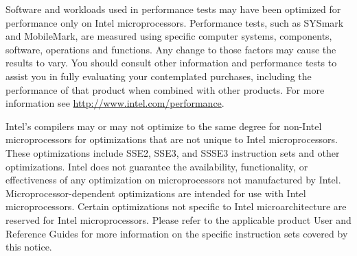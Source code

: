 
Software and workloads used in performance tests may have been
optimized for performance only on Intel microprocessors.  Performance
tests, such as SYSmark and MobileMark, are measured using specific
computer systems, components, software, operations and functions.  Any
change to those factors may cause the results to vary.  You
should consult other information and performance tests to assist you
in fully evaluating your contemplated purchases, including the
performance of that product when combined with other products.  For
more information see \url{http://www.intel.com/performance}.

Intel's compilers may or may not optimize to the same degree for
non-Intel microprocessors for optimizations that are not unique to
Intel microprocessors. These optimizations include SSE2, SSE3, and
SSSE3 instruction sets and other optimizations. Intel does not
guarantee the availability, functionality, or effectiveness of any
optimization on microprocessors not manufactured by
Intel. Microprocessor-dependent optimizations 
are intended for use with Intel microprocessors. Certain optimizations not
specific to Intel microarchitecture are reserved for Intel
microprocessors. Please refer to the applicable product User and
Reference Guides for more information on the specific
instruction sets covered by this notice.
